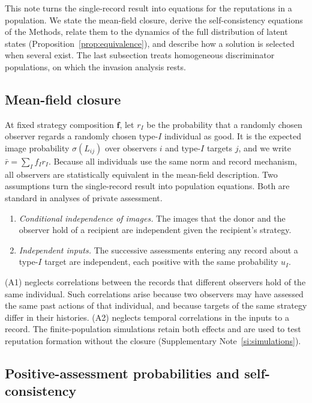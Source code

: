 \documentclass[10pt]{wlscirep}
\theoremstyle{plain}
\theoremstyle{remark}
\begin{document}
This note turns the single-record result into equations for the reputations in a population. We state the mean-field closure, derive the self-consistency equations of the Methods, relate them to the dynamics of the full distribution of latent states (Proposition~\ref{prop:equivalence}), and describe how a solution is selected when several exist. The last subsection treats homogeneous discriminator populations, on which the invasion analysis rests.

\subsection{Mean-field closure}

At fixed strategy composition $\bm f$, let $r_I$ be the probability that a randomly chosen observer regards a randomly chosen type-$I$ individual as good. It is the expected image probability $\sigma(L_{ij})$ over observers $i$ and type-$I$ targets $j$, and we write $\bar r=\sum_If_Ir_I$. Because all individuals use the same norm and record mechanism, all observers are statistically equivalent in the mean-field description. Two assumptions turn the single-record result into population equations. Both are standard in analyses of private assessment.
\begin{enumerate}
\item[(A1)] \textit{Conditional independence of images.} The images that the donor and the observer hold of a recipient are independent given the recipient's strategy.
\item[(A2)] \textit{Independent inputs.} The successive assessments entering any record about a type-$I$ target are independent, each positive with the same probability $u_I$.
\end{enumerate}
(A1) neglects correlations between the records that different observers hold of the same individual. Such correlations arise because two observers may have assessed the same past actions of that individual, and because targets of the same strategy differ in their histories. (A2) neglects temporal correlations in the inputs to a record. The finite-population simulations retain both effects and are used to test reputation formation without the closure (Supplementary Note~\ref{si:simulations}).

\subsection{Positive-assessment probabilities and self-consistency}
\end{document}
